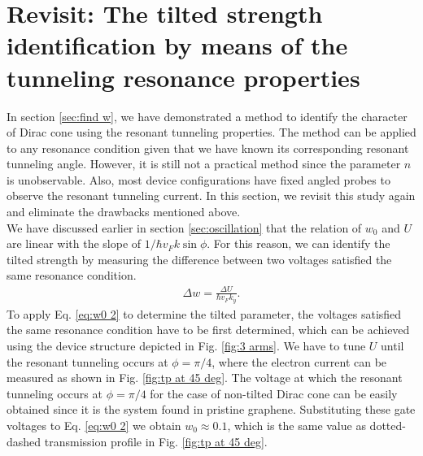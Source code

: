 \section{Revisit: The tilted strength identification by means of the tunneling resonance properties} \label{sec:find w 2}
    In section \ref{sec:find w}, we have demonstrated a method to identify the character of Dirac cone using the resonant tunneling properties.
    The method can be applied to any resonance condition given that we have known its corresponding resonant tunneling angle.
    However, it is still not a practical method since the parameter $n$ is unobservable.
    Also, most device configurations have fixed angled probes to observe the resonant tunneling current.
    In this section, we revisit this study again and eliminate the drawbacks mentioned above.\\
    
    We have discussed earlier in section \ref{sec:oscillation} that the relation of $w_0$ and $U$ are linear with the slope of $1/\hbar v_F k \sin{\phi}$.
    For this reason, we can identify the tilted strength by measuring the difference between two voltages satisfied the same resonance condition.
    \begin{align} \label{eq:w0 2}
        \Delta w = \frac{\Delta U}{\hbar v_F k_y}.
    \end{align}
    To apply Eq. \ref{eq:w0 2} to determine the tilted parameter, the voltages satisfied the same resonance condition have to be first determined,
    which can be achieved using the device structure depicted in Fig. \ref{fig:3 arms}. We have to tune $U$ until the resonant tunneling occurs at $\phi = \pi/4$,
    where the electron current can be measured as shown in Fig. \ref{fig:tp at 45 deg}.
    The voltage at which the resonant tunneling occurs at $\phi = \pi/4$ for the case of non-tilted Dirac cone can be easily obtained since it is the system found in pristine graphene.
    Substituting these gate voltages to Eq. \ref{eq:w0 2} we obtain $w_0 \approx 0.1$, which is the same value as dotted-dashed transmission profile in Fig. \ref{fig:tp at 45 deg}.

